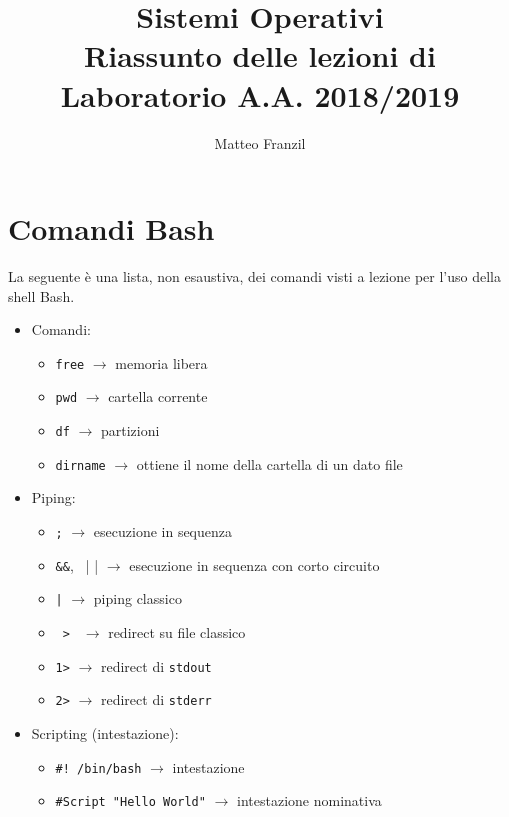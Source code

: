\documentclass[a4paper]{article}
\title{%
  Sistemi Operativi \\
  \large Riassunto delle lezioni di Laboratorio A.A. 2018/2019}
\author{Matteo Franzil}
\begin{document}
\maketitle

\tableofcontents

\section{Comandi Bash}

La seguente è una lista, non esaustiva, dei comandi visti a lezione per l'uso della shell Bash.

\begin{itemize}

\item Comandi:

\begin{itemize}
\item\verb|free| $\rightarrow$ memoria libera
\item\verb|pwd| $\rightarrow$ cartella corrente
\item\verb|df| $\rightarrow$ partizioni
\item\verb|dirname| $\rightarrow$ ottiene il nome della cartella di un dato file 
\end{itemize}

\item Piping:
\begin{itemize}
\item\verb|;| $\rightarrow$ esecuzione in sequenza
\item\verb|&&|, \verb| || | $\rightarrow$ esecuzione in sequenza con corto circuito 
\item\verb=|= $\rightarrow$ piping classico
\item\verb| > | $\rightarrow$ redirect su file classico
\item\verb|1>| $\rightarrow$ redirect di \verb|stdout|
\item\verb|2>| $\rightarrow$ redirect di \verb|stderr|
\end{itemize}

\item Scripting (intestazione):
\begin{itemize}
\item\verb|#! /bin/bash| $\rightarrow$ intestazione
\item\verb|#Script "Hello World"| $\rightarrow$ intestazione nominativa
\end{itemize}


\end{itemize}
\end{document}
